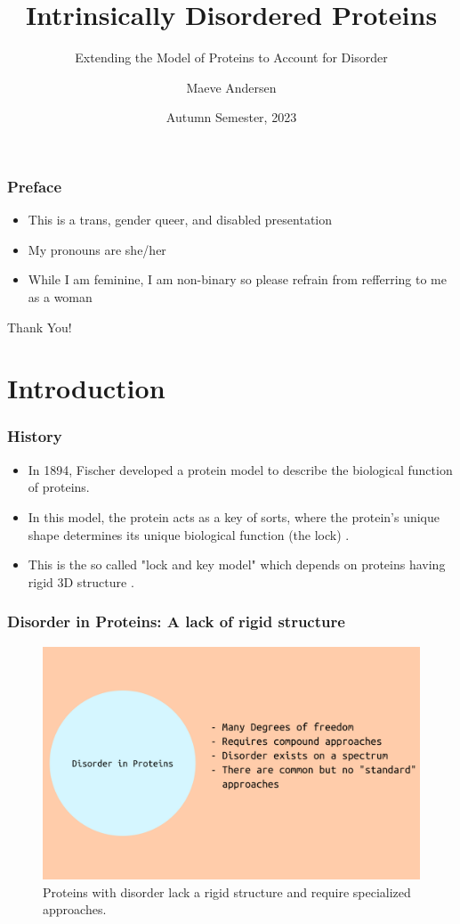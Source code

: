 \documentclass{beamer}
\title{Intrinsically Disordered Proteins}
\subtitle{Extending the Model of Proteins to Account for Disorder}
\author{Maeve Andersen}
\date{Autumn Semester, 2023}
\begin{document}
\frame{\titlepage}



\begin{frame}
    \frametitle{Preface}
    \begin{itemize}
        \item This is a trans, gender queer, and disabled presentation
        \item My pronouns are she/her 
        \item While I am feminine, I am non-binary so please refrain from refferring to me as a woman
    \end{itemize}
Thank You!
\end{frame}

\section{Introduction}

\begin{frame}
\frametitle{History}
\begin{itemize}
    \item In 1894, Fischer developed a protein model to describe the biological function of proteins.
    \item In this model, the protein acts as a key of sorts, where the protein's unique shape determines its unique biological function (the lock) \cite{fischerEinflussConfigurationAuf1894}.
    \item This is the so called "lock and key model" which depends on proteins having rigid 3D structure \cite{fischerEinflussConfigurationAuf1894}.
\end{itemize}
\end{frame}

\begin{frame}
\frametitle{Disorder in Proteins: A lack of rigid structure}
\begin{figure}
    \centering
    \includegraphics[scale=0.3]{intro.png}
    \caption{Proteins with disorder lack a rigid structure and require specialized approaches.}
    \label{fig:intro}
\end{figure}
\end{frame}
\end{document}
